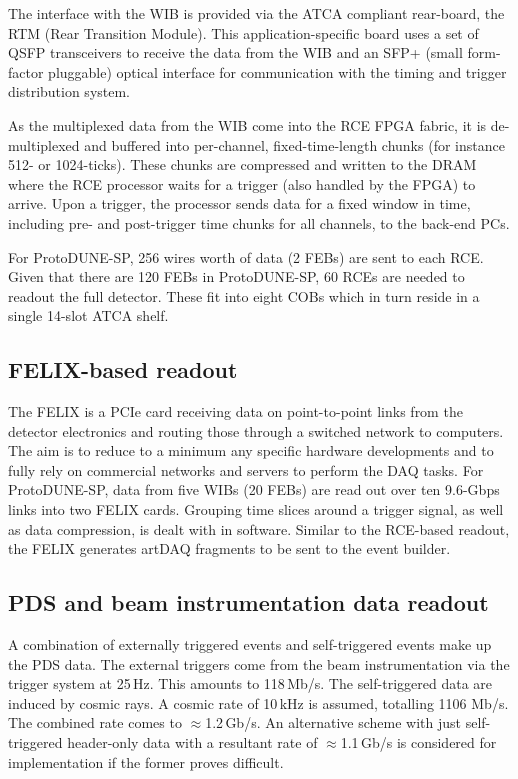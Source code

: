 The interface with the WIB is provided via the ATCA compliant rear-board, the RTM (Rear Transition Module).  
This application-specific board uses a set of QSFP transceivers to receive
the data from the WIB and an SFP+ (small form-factor pluggable)
 optical interface for communication
with the timing and trigger distribution system.

As the multiplexed data from the WIB come into the RCE FPGA fabric,
it is de-multiplexed and buffered into per-channel, fixed-time-length 
chunks (for instance 512- or 1024-ticks).  These chunks are
compressed and written to the DRAM where the RCE processor waits
for a trigger (also handled by the FPGA) to arrive.  Upon a trigger, the
processor sends data for a fixed window in time, including pre- and post-trigger time chunks
for all channels, to the back-end PCs.  

For ProtoDUNE-SP, 256 wires worth of data (2 FEBs) are sent to each RCE.
Given that there are 120 FEBs in ProtoDUNE-SP, 60 RCEs are needed to
readout the full detector.  These fit into eight COBs which in turn
reside in a single 14-slot ATCA shelf.

\subsection{FELIX-based readout}
The FELIX is a PCIe card receiving data on point-to-point links from
the detector electronics and routing those through a switched network
to computers.  The aim is to reduce to a minimum any specific hardware
developments and to fully rely on commercial networks and servers to
perform the DAQ tasks.  For ProtoDUNE-SP, data from five WIBs (20 FEBs) are read out over ten 9.6-Gbps links into two FELIX cards.  Grouping
time slices around a trigger signal, as well as data compression, is
dealt with in software. Similar to the RCE-based readout, the FELIX 
generates artDAQ fragments to be sent to the event builder.


\subsection{PDS and beam instrumentation data readout}
\label{subsec:pds-readout}

A combination of externally triggered events
and self-triggered events make up the PDS data.  The external triggers
come from the beam instrumentation via the trigger system at 25\,Hz.
This amounts to 118\,Mb/s.  The self-triggered data
are induced by cosmic rays.  A cosmic rate of 10\,kHz is assumed,
totalling 1106 Mb/s.
The combined rate comes to $\approx$1.2\,Gb/s.  An alternative scheme with
just self-triggered header-only data with a resultant rate of $\approx$1.1\,Gb/s is considered for implementation if
the former proves difficult.


